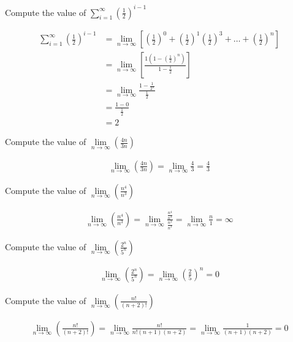 \documentclass[12pt]{article}
\newenvironment{sol}[1][Solution]{\begin{trivlist}
\item[\hskip\labelsep {\bfseries #1:}]}{\end{trivlist}}
\begin{document}
\begin{enumerate}
    \item Compute the value of $\sum_{i = 1}^{\infty}(\frac{1}{2})^{i-1}$
    \begin{sol}
    \begin{align*}
    \sum_{i=1}^{\infty}(\frac{1}{2})^{i-1}
    & = \lim_{n \rightarrow{\infty}}[(\frac{1}{2})^0 + (\frac{1}{2})^1 (\frac{1}{2})^3 + \dots + (\frac{1}{2})^n] \\
    & = \lim_{n \rightarrow{\infty}}[\frac{1(1-(\frac{1}{2})^n)}{1-\frac{1}{2}}] \\
    & = \lim_{n \rightarrow{\infty}}\frac{1-\frac{1}{2^n}}{\frac{1}{2}}\\
    & = \frac{1-0}{\frac{1}{2}}\\
    & = 2
\end{align*}
    \end{sol}

    \item Compute the value of $  \lim\limits_{n\to\infty} (\frac{4n}{3n})$
    \begin{sol}
    \begin{align*}
    \lim_{n \to \infty}(\frac{4n}{3n})= \lim_{n \to \infty}{\frac{4}{3}} = \frac{4}{3}
\end{align*}
    \end{sol}

    
    \item Compute the value of $\lim\limits_{n \to \infty}(\frac{n^4}{n^3})$
    \begin{sol}
        \begin{align*}
            \lim_{n \to \infty}(\frac{n^4}{n^3}) 
            = \lim_{n \to \infty}\frac{\frac{n^4}{n^3}}{\frac{n^3}{n^3}} 
            = \lim_{n \to \infty} \frac{n}{1} = \infty
        \end{align*}
    \end{sol}

    \item Compute the value of $\lim\limits_{n \to \infty}(\frac{2^n}{5^n})$
    \begin{sol}
        \begin{align*}
            \lim_{n \to \infty}(\frac{2^n}{5^n})
            = \lim_{n \to \infty}(\frac{2}{5})^n = 0 
        \end{align*}
    \end{sol}

    \item Compute the value of $\lim\limits_{n \to \infty}(\frac{n!}{(n+2)!})$
    \begin{sol}
        \begin{align*}
            \lim_{n \to \infty}(\frac{n!}{(n+2)!}) 
            = \lim_{n \to \infty}{\frac{n!}{n!(n+1)(n+2)}} 
            = \lim_{n \to \infty}{\frac{1}{(n+1)(n+2)}}
            = 0
        \end{align*}
    \end{sol}


\end{enumerate}
\end{document}
